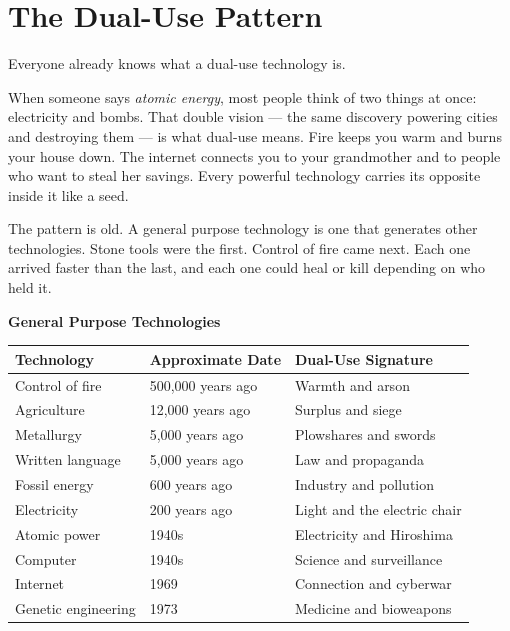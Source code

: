 \section*{The Dual-Use Pattern}
\label{spine:cw-the-dual-use-pattern}

Everyone already knows what a dual-use technology is.

When someone says \textit{atomic energy}, most people think of two things at once: electricity and bombs. That double vision --- the same discovery powering cities and destroying them --- is what dual-use means. Fire keeps you warm and burns your house down. The internet connects you to your grandmother and to people who want to steal her savings. Every powerful technology carries its opposite inside it like a seed.

The pattern is old. A general purpose technology is one that generates other technologies. Stone tools were the first. Control of fire came next. Each one arrived faster than the last, and each one could heal or kill depending on who held it.

\vspace{0.5cm}
\begin{center}
\textbf{General Purpose Technologies}
\end{center}
\vspace{0.3cm}

\noindent\begin{tabular}{p{3.8cm}p{4.2cm}p{6cm}}
\textbf{Technology} & \textbf{Approximate Date} & \textbf{Dual-Use Signature} \\
\hline
Control of fire & 500,000 years ago & Warmth and arson \\
Agriculture & 12,000 years ago & Surplus and siege \\
Metallurgy & 5,000 years ago & Plowshares and swords \\
Written language & 5,000 years ago & Law and propaganda \\
Fossil energy & 600 years ago & Industry and pollution \\
Electricity & 200 years ago & Light and the electric chair \\
Atomic power & 1940s & Electricity and Hiroshima \\
Computer & 1940s & Science and surveillance \\
Internet & 1969 & Connection and cyberwar \\
Genetic engineering & 1973 & Medicine and bioweapons \\
\end{tabular}

